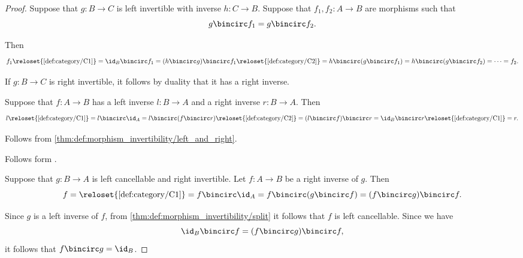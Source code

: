 \begin{proof}
   Suppose that \( g: B \to C \) is left invertible with inverse \( h: C \to B \). Suppose that \( f_1, f_2: A \to B \) are morphisms such that
  \begin{equation*}
    g \bincirc f_1 = g \bincirc f_2.
  \end{equation*}

  Then
  \begin{equation*}
    f_1
    \reloset {\ref{def:category/C1}} =
    \id_B \bincirc f_1
    =
    (h \bincirc g) \bincirc f_1
    \reloset {\ref{def:category/C2}} =
    h \bincirc (g \bincirc f_1)
    =
    h \bincirc (g \bincirc f_2)
    =
    \cdots
    =
    f_2.
  \end{equation*}

  If \( g: B \to C \) is right invertible, it follows by duality that it has a right inverse.

   Suppose that \( f: A \to B \) has a left inverse \( l: B \to A \) and a right inverse \( r: B \to A \). Then
  \begin{equation*}
    l
    \reloset {\ref{def:category/C1}} =
    l \bincirc \id_A
    =
    l \bincirc (f \bincirc r)
    \reloset {\ref{def:category/C2}} =
    (l \bincirc f) \bincirc r
    =
    \id_B \bincirc r
    \reloset {\ref{def:category/C1}} =
    r.
  \end{equation*}

   Follows from \cref{thm:def:morphism_invertibility/left_and_right}.

   Follows form .

   Suppose that \( g: B \to A \) is left cancellable and right invertible. Let \( f: A \to B \) be a right inverse of \( g \). Then
  \begin{equation*}
    f
    =
    \reloset {\ref{def:category/C1}} =
    f \bincirc \id_A
    =
    f \bincirc (g \bincirc f)
    =
    (f \bincirc g) \bincirc f.
  \end{equation*}

  Since \( g \) is a left inverse of \( f \), from \cref{thm:def:morphism_invertibility/split} it follows that \( f \) is left cancellable. Since we have
  \begin{equation*}
    \id_B \bincirc f
    =
    (f \bincirc g) \bincirc f,
  \end{equation*}
  it follows that \( f \bincirc g = \id_B \).


\end{proof}
